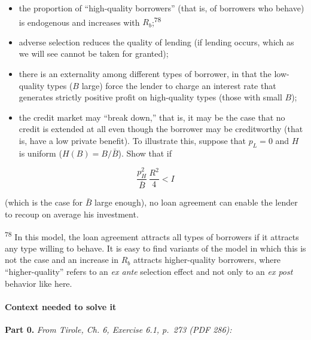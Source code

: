 \documentclass[11pt,a4paper]{article}
\providecommand{\tightlist}{\setlength{\itemsep}{0pt}\setlength{\parskip}{0pt}}
\begin{document}
\begin{itemize}
\tightlist
\item
  the proportion of ``high-quality borrowers'' (that is, of borrowers who behave) is endogenous and
  increases with \(R_b\);\textsuperscript{78}
\item
  adverse selection reduces the quality of lending (if lending occurs, which as we will see cannot
  be taken for granted);
\item
  there is an externality among different types of borrower, in that the low-quality types (\(B\)
  large) force the lender to charge an interest rate that generates strictly positive profit on
  high-quality types (those with small \(B\));
\item
  the credit market may ``break down,'' that is, it may be the case that no credit is extended at
  all even though the borrower may be creditworthy (that is, have a low private benefit). To
  illustrate this, suppose that \(p_L = 0\) and \(H\) is uniform (\(H(B) = B/\bar B\)). Show that if
\end{itemize}

\[\frac{p_H^2}{\bar B}\,\frac{R^2}{4} < I\]

(which is the case for \(\bar B\) large enough), no loan agreement can enable the lender to recoup
on average his investment.

\textsuperscript{78} In this model, the loan agreement attracts all types of borrowers if it
attracts any type willing to behave. It is easy to find variants of the model in which this is not
the case and an increase in \(R_b\) attracts higher-quality borrowers, where ``higher-quality''
refers to an \emph{ex ante} selection effect and not only to an \emph{ex post} behavior like here.

\paragraph{Context needed to solve it}

\textbf{Part 0.} \emph{From Tirole, Ch. 6, Exercise 6.1, p.~273 (PDF 286):}
\end{document}
